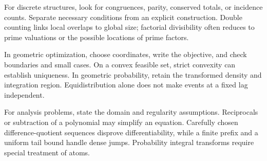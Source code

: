 For discrete structures, look for congruences, parity, conserved totals, or incidence counts. Separate necessary conditions from an explicit construction. Double counting links local overlaps to global size; factorial divisibility often reduces to prime valuations or the possible locations of prime factors.

In geometric optimization, choose coordinates, write the objective, and check boundaries and small cases. On a convex feasible set, strict convexity can establish uniqueness. In geometric probability, retain the transformed density and integration region. Equidistribution alone does not make events at a fixed lag independent.

For analysis problems, state the domain and regularity assumptions. Reciprocals or subtraction of a polynomial may simplify an equation. Carefully chosen difference-quotient sequences disprove differentiability, while a finite prefix and a uniform tail bound handle dense jumps. Probability integral transforms require special treatment of atoms.
\par\smallskip
